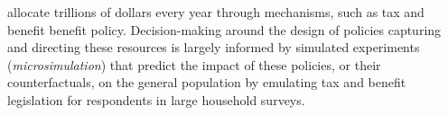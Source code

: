 \documentclass[10pt,journal,compsoc]{IEEEtran}
\begin{document}
\IEEEdisplaynontitleabstractindextext
%
\IEEEpeerreviewmaketitle






% 
% 
 allocate trillions of dollars every year through mechanisms, such as tax and benefit benefit policy. Decision-making around the design of policies capturing and directing these resources is largely informed by simulated experiments (\emph{microsimulation}) that predict the impact of these policies, or their counterfactuals, on the general population by emulating tax and benefit legislation for respondents in large household surveys.
\end{document}
